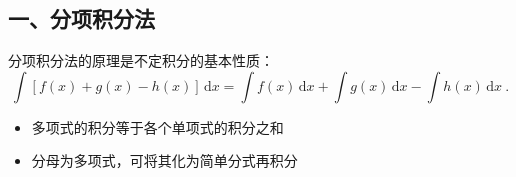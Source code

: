 

\subsection{一、分项积分法}
分项积分法的原理是不定积分的基本性质：
$$
\int \left[f(x)+g(x)-h(x)\right]\,\mathrm{d}x=\int f(x)\,\mathrm{d}x+\int g(x)\,\mathrm{d}x-\int h(x)\,\mathrm{d}x~.
$$

\begin{itemize}
\item 多项式的积分等于各个单项式的积分之和
\end{itemize}
\begin{itemize}
\item 分母为多项式，可将其化为简单分式再积分
\end{itemize}

